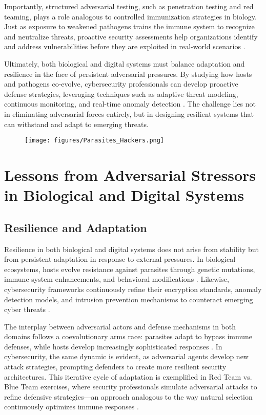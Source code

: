 \documentclass{article}
\begin{document}
Importantly, structured adversarial testing, such as penetration testing and red teaming, plays a role analogous to controlled immunization strategies in biology. Just as exposure to weakened pathogens trains the immune system to recognize and neutralize threats, proactive security assessments help organizations identify and address vulnerabilities before they are exploited in real-world scenarios \citep{shostack2014threatmodeling}. 

Ultimately, both biological and digital systems must balance adaptation and resilience in the face of persistent adversarial pressures. By studying how hosts and pathogens co-evolve, cybersecurity professionals can develop proactive defense strategies, leveraging techniques such as adaptive threat modeling, continuous monitoring, and real-time anomaly detection \citep{barabasi2016network}. The challenge lies not in eliminating adversarial forces entirely, but in designing resilient systems that can withstand and adapt to emerging threats.

\begin{figure}
    \centering
    \texttt{[image: figures/Parasites\_Hackers.png]}
    \label{fig:Parasites_Hackers.png}
\end{figure}

\section{Lessons from Adversarial Stressors in Biological and Digital Systems}
\subsection{Resilience and Adaptation}
Resilience in both biological and digital systems does not arise from stability but from persistent adaptation in response to external pressures. In biological ecosystems, hosts evolve resistance against parasites through genetic mutations, immune system enhancements, and behavioral modifications \citep{anderson1991infectious}. Likewise, cybersecurity frameworks continuously refine their encryption standards, anomaly detection models, and intrusion prevention mechanisms to counteract emerging cyber threats \citep{shostack2014threatmodeling}.

The interplay between adversarial actors and defense mechanisms in both domains follows a coevolutionary arms race: parasites adapt to bypass immune defenses, while hosts develop increasingly sophisticated responses \citep{schneier2000secrets}. In cybersecurity, the same dynamic is evident, as adversarial agents develop new attack strategies, prompting defenders to create more resilient security architectures. This iterative cycle of adaptation is exemplified in Red Team vs. Blue Team exercises, where security professionals simulate adversarial attacks to refine defensive strategies—an approach analogous to the way natural selection continuously optimizes immune responses \citep{harris2020ethicalhacking}.
\end{document}
